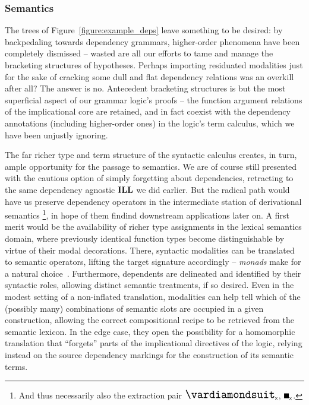 \subsubsection{Semantics}
The trees of Figure~\ref{figure:example_deps} leave something to be desired: by backpedaling towards dependency grammars, higher-order phenomena have been completely dismissed -- wasted are all our efforts to tame and manage the bracketing structures of hypotheses.
Perhaps importing residuated modalities just for the sake of cracking some dull and flat dependency relations was an overkill after all?
The answer is no.
Antecedent bracketing structures is but the most superficial aspect of our grammar logic's proofs -- the function argument relations of the implicational core are retained, and in fact coexist with the dependency annotations (including higher-order ones) in the logic's term calculus, which we have been unjustly ignoring.

The far richer type and term structure of the syntactic calculus creates, in turn, ample opportunity for the passage to semantics.
We are of course still presented with the cautious option of simply forgetting about dependencies, retracting to the same dependency agnostic $\textbf{ILL}$ we did earlier.
But the radical path would have us preserve dependency operators in the intermediate station of derivational semantics%
	\footnote{And thus necessarily also the extraction pair $\dxdia{x}$, $\dxbox{x}$.},
in hope of them findind downstream applications later on.
A first merit would be the availability of richer type assignments in the lexical semantics domain, where previously identical function types become distinguishable by virtue of their modal decorations.
There, syntactic modalities can be translated to semantic operators, lifting the target signature accordingly -- \textit{monads} make for a natural choice~\cite{kobayashi1997monad}.
Furthermore, dependents are delineated and identified by their syntactic roles, allowing distinct semantic treatments, if so desired.
Even in the modest setting of a non-inflated translation, modalities can help tell which of the (possibly many) combinations of semantic slots are occupied in a given construction, allowing the correct compositional recipe to be retrieved from the semantic lexicon.
In the edge case, they open the possibility for a homomorphic translation that ``forgets'' parts of the implicational directives of the logic, relying instead on the source dependency markings for the construction of its semantic terms.


